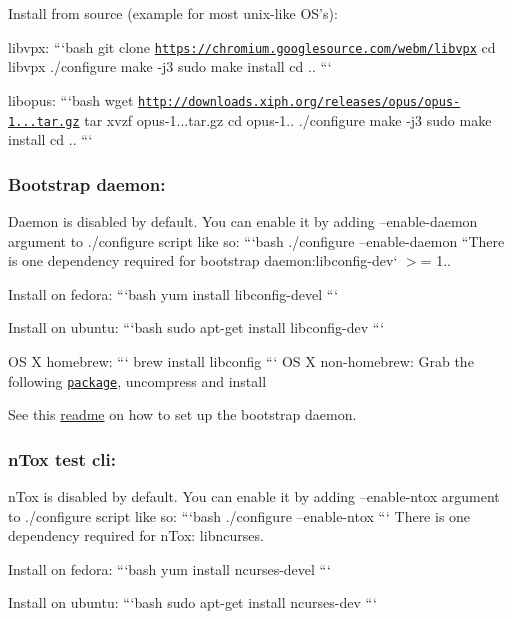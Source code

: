 Install from source (example for most unix-\/like O\+S's)\+:

libvpx\+: ```bash git clone \href{https://chromium.googlesource.com/webm/libvpx}{\tt https\+://chromium.\+googlesource.\+com/webm/libvpx} cd libvpx ./configure make -\/j3 sudo make install cd .. ```

libopus\+: ```bash wget \href{http://downloads.xiph.org/releases/opus/opus-1.0.3.tar.gz}{\tt http\+://downloads.\+xiph.\+org/releases/opus/opus-\/1...\+tar.\+gz} tar xvzf opus-\/1...\+tar.\+gz cd opus-\/1.. ./configure make -\/j3 sudo make install cd .. ```

\label{_bootstrapd}%
 \subsubsection*{Bootstrap daemon\+:}

Daemon is disabled by default. You can enable it by adding --enable-\/daemon argument to ./configure script like so\+: ```bash ./configure --enable-\/daemon ``{\ttfamily  There is one dependency required for bootstrap daemon\+:}libconfig-\/dev` $>$= 1..

Install on fedora\+: ```bash yum install libconfig-\/devel ```

Install on ubuntu\+: ```bash sudo apt-\/get install libconfig-\/dev ```

O\+S X homebrew\+: ``` brew install libconfig ``` O\+S X non-\/homebrew\+: Grab the following \href{http://www.hyperrealm.com/libconfig/}{\tt package}, uncompress and install

See this \hyperlink{md_other_bootstrap_daemon__r_e_a_d_m_e}{readme} on how to set up the bootstrap daemon.

\label{_ntox}%
 \subsubsection*{n\+Tox test cli\+:}

n\+Tox is disabled by default. You can enable it by adding --enable-\/ntox argument to ./configure script like so\+: ```bash ./configure --enable-\/ntox ``` There is one dependency required for n\+Tox\+: libncurses.

Install on fedora\+: ```bash yum install ncurses-\/devel ```

Install on ubuntu\+: ```bash sudo apt-\/get install ncurses-\/dev ``` 